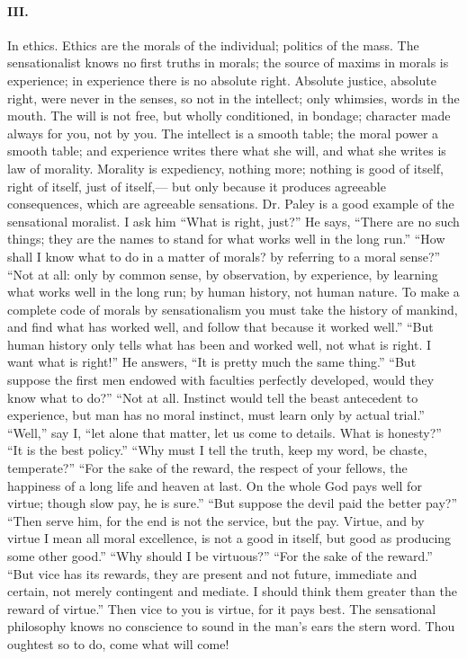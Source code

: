 \documentclass[12pt]{article}
\begin{document}
\paragraph{III.} In ethics. Ethics are the morals of the individual; politics of the mass. The sensationalist knows no first truths in morals; the source of maxims in morals is experience; in experience there is no absolute right. Absolute justice, absolute right, were never in the senses, so not in the intellect; only whimsies, words in the mouth. The will is not free, but wholly conditioned, in bondage; character made always for you, not by you. The intellect is a smooth table; the moral power a smooth table; and experience writes there what she will, and what she writes is law of morality. Morality is expediency, nothing more; nothing is good of itself, right of itself, just of itself,--- but only because it produces agreeable consequences, which are agreeable sensations. Dr. Paley is a good example of the sensational moralist. I ask him ``What is right, just?'' He says, ``There are no such things; they are the names to stand for what works well in the long run.'' ``How shall I know what to do in a matter of morals? by referring to a moral sense?'' ``Not at all: only by common sense, by observation, by experience, by learning what works well in the long run; by human history, not human nature. To make a complete code of morals by sensationalism you must take the history of mankind, and find what has worked well, and follow that because it worked well.'' ``But human history only tells what has been and worked well, not what is right. I want what is right!'' He answers, ``It is pretty much the same thing.'' ``But suppose the first men endowed with faculties perfectly developed, would they know what to do?'' ``Not at all. Instinct would tell the beast antecedent to experience, but man has no moral instinct, must learn only by actual trial.'' ``Well,'' say I, ``let alone that matter, let us come to details. What is honesty?'' ``It is the best policy.'' ``Why must I tell the truth, keep my word, be chaste, temperate?'' ``For the sake of the reward, the respect of your fellows, the happiness of a long life and heaven at last. On the whole God pays well for virtue; though slow pay, he is sure.'' ``But suppose the devil paid the better pay?'' ``Then serve him, for the end is not the service, but the pay. Virtue, and by virtue I mean all moral excellence, is not a good in itself, but good as producing some other good.'' ``Why should I be virtuous?'' ``For the sake of the reward.'' ``But vice has its rewards, they are present and not future, immediate and certain, not merely contingent and mediate. I should think them greater than the reward of virtue.'' Then vice to you is virtue, for it pays best. The sensational philosophy knows no conscience to sound in the man's ears the stern word. Thou oughtest so to do, come what will come!
\end{document}
